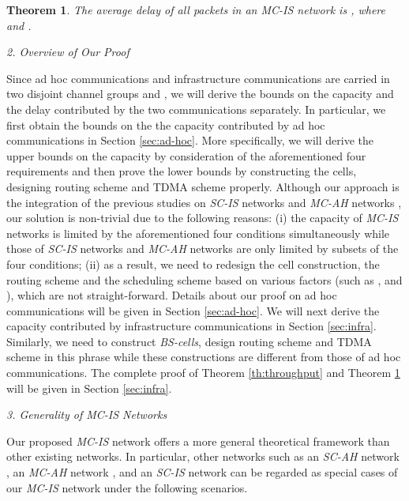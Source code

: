 \documentclass[10pt,journal]{IEEEtran}
\newtheorem{theorem}{Theorem}
\begin{document}
\begin{theorem}
\label{th:delay}
The average delay of all packets in an \textit{MC-IS} network is , where  and .
\end{theorem}

\emph{2. Overview of Our Proof}

Since ad hoc communications and infrastructure communications are carried in two disjoint channel groups  and , we will derive the bounds on the capacity and the delay contributed by the two communications separately. In particular, we first obtain the bounds on the the capacity contributed by ad hoc communications in Section \ref{sec:ad-hoc}. More specifically, we will derive the upper bounds on the capacity by consideration of the aforementioned four requirements and then prove the lower bounds by constructing the cells, designing routing scheme and TDMA scheme properly. Although our approach is the integration of the previous studies on \textit{SC-IS} networks \cite{panli:jsac09} and \textit{MC-AH} networks \cite{Kyasanur:mobicom2005}, our solution is non-trivial due to the following reasons: (i) the capacity of \textit{MC-IS} networks is limited by the aforementioned four conditions simultaneously while those of \textit{SC-IS} networks and \textit{MC-AH} networks are only limited by subsets of the four conditions; (ii) as a result, we need to redesign the cell construction, the routing scheme and the scheduling scheme based on various factors (such as ,  and ), which are not straight-forward. Details about our proof on ad hoc communications will be given in Section \ref{sec:ad-hoc}. We will next derive the capacity contributed by infrastructure communications in Section \ref{sec:infra}. Similarly, we need to construct \textit{BS-cells}, design routing scheme and TDMA scheme in this phrase while these constructions are different from those of ad hoc communications. The complete proof of Theorem \ref{th:throughput} and Theorem \ref{th:delay} will be given in Section \ref{sec:infra}.

\emph{3. Generality of \textit{MC-IS} Networks}

Our proposed \textit{MC-IS} network offers a more general theoretical framework than other existing networks. In particular, other networks such as an \textit{SC-AH} network \cite{Gupta:Kumar}, an \textit{MC-AH} network \cite{Kyasanur:mobicom2005}, and an \textit{SC-IS} network \cite{panli:jsac09} can be regarded as special cases of our \textit{MC-IS} network under the following scenarios. 
\end{document}
